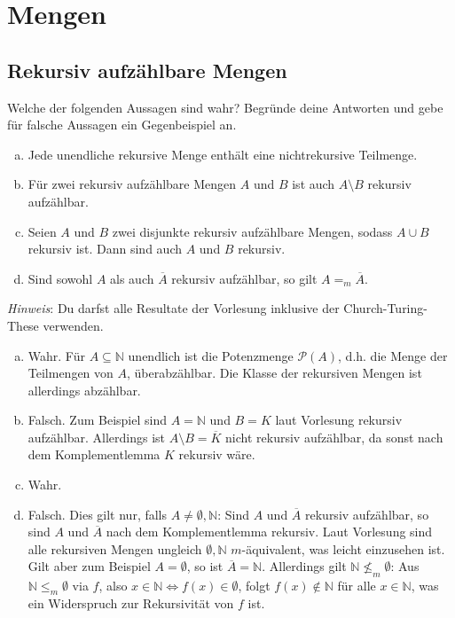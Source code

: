 \documentclass[german,headsepline]{scrartcl}
\theoremstyle{definition}
\begin{document}
	\section{Mengen}
	\subsection{Rekursiv aufzählbare Mengen}
	\begin{question}
		Welche der folgenden Aussagen sind wahr?
		Begründe deine Antworten und gebe für falsche Aussagen ein Gegenbeispiel an.
		\begin{enumerate}[(a)]
			\item Jede unendliche rekursive Menge enthält eine nichtrekursive Teilmenge.
			\item Für zwei rekursiv aufzählbare Mengen $A$ und $B$ ist auch $A\setminus B$ rekursiv aufzählbar.
			\item Seien $A$ und $B$ zwei disjunkte rekursiv aufzählbare Mengen, sodass $A\cup B$ rekursiv ist.
			Dann sind auch $A$ und $B$ rekursiv.
			\item Sind sowohl $A$ als auch $\overline{A}$ rekursiv aufzählbar, so gilt $A=_m\overline{A}$.
		\end{enumerate}
		\textit{Hinweis}: Du darfst alle Resultate der Vorlesung inklusive der Church-Turing-These verwenden.
	\end{question}
	\begin{solution}
		\begin{enumerate}[(a)]
			\item Wahr. Für $A\subseteq\mathbb{N}$ unendlich ist die Potenzmenge $\mathcal{P}(A)$,
			d.h. die Menge der Teilmengen von $A$, überabzählbar.
			Die Klasse der rekursiven Mengen ist allerdings abzählbar.
			\item Falsch. Zum Beispiel sind $A=\mathbb{N}$ und $B=K$ laut Vorlesung rekursiv aufzählbar.
			Allerdings ist $A\setminus B=\overline{K}$ nicht rekursiv aufzählbar,
			da sonst nach dem Komplementlemma $K$ rekursiv wäre.
			\item Wahr.
			\item Falsch. Dies gilt nur, falls $A\neq\emptyset,\mathbb{N}$:
			Sind $A$ und $\overline{A}$ rekursiv aufzählbar,
			so sind $A$ und $\overline{A}$ nach dem Komplementlemma rekursiv.
			Laut Vorlesung sind alle rekursiven Mengen ungleich $\emptyset,\mathbb{N}$ $m$-äquivalent,
			was leicht einzusehen ist. \\
			Gilt aber zum Beispiel $A=\emptyset$, so ist $\overline{A}=\mathbb{N}$.
			Allerdings gilt $\mathbb{N}\not\leq_m\emptyset$:
			Aus $\mathbb{N}\leq_m\emptyset$ via $f$, also $x\in\mathbb{N}\Leftrightarrow f(x)\in\emptyset$,
			folgt $f(x)\not\in\mathbb{N}$ für alle $x\in\mathbb{N}$,
			was ein Widerspruch zur Rekursivität von $f$ ist.
		\end{enumerate}
	\end{solution}
	
\end{document}
